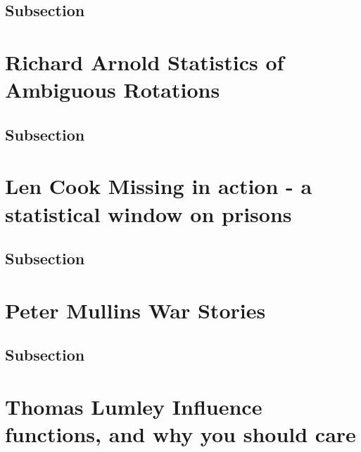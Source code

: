 \documentclass[
]{book}
\begin{document}
\hypertarget{subsection}{%
\section{Subsection}\label{subsection}}

\hypertarget{richard-arnold-statistics-of-ambiguous-rotations}{%
\chapter*{Richard Arnold \textbar{} Statistics of Ambiguous Rotations}\label{richard-arnold-statistics-of-ambiguous-rotations}}

\hypertarget{subsection}{%
\section{Subsection}\label{subsection}}

\hypertarget{len-cook-missing-in-action---a-statistical-window-on-prisons}{%
\chapter*{Len Cook \textbar{} Missing in action - a statistical window on prisons}\label{len-cook-missing-in-action---a-statistical-window-on-prisons}}

\hypertarget{subsection}{%
\section{Subsection}\label{subsection}}

\hypertarget{peter-mullins-war-stories}{%
\chapter*{Peter Mullins \textbar{} War Stories}\label{peter-mullins-war-stories}}

\hypertarget{subsection}{%
\section{Subsection}\label{subsection}}

\hypertarget{thomas-lumley-influence-functions-and-why-you-should-care}{%
\chapter*{Thomas Lumley \textbar{} Influence functions, and why you should care}\label{thomas-lumley-influence-functions-and-why-you-should-care}}
\end{document}

